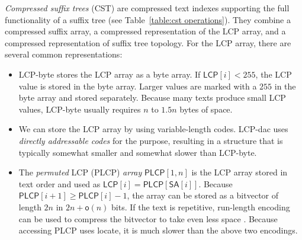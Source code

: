 \documentclass[a4paper,11pt]{llncs}
\newcommand{\CST}{\textsf{CST}}
\newcommand{\mSA}{\ensuremath{\mathsf{SA}}}
\newcommand{\LCP}{\textsf{LCP}}
\newcommand{\PLCP}{\textsf{PLCP}}
\newcommand{\LCPbyte}{\textsf{LCP\nobreakdash-byte}}
\newcommand{\LCPdac}{\textsf{LCP\nobreakdash-dac}}
\newcommand{\mLCP}{\ensuremath{\mathsf{LCP}}}
\newcommand{\mPLCP}{\ensuremath{\mathsf{PLCP}}}
\newcommand{\locate}{\textsf{locate}}
\newcommand{\oh}{\ensuremath{\mathsf{o}}}
\begin{document}
\emph{Compressed suffix trees} (\CST) \cite{Sadakane2007} are compressed text
indexes supporting the full functionality of a suffix tree (see
Table~\ref{table:cst operations}). They combine a compressed suffix array, a
compressed representation of the \LCP{} array, and a compressed representation
of suffix tree topology. For the \LCP{} array, there are several common
representations:
\begin{itemize}
\item \LCPbyte{} \cite{Abouelhoda2004} stores the \LCP{} array as a byte
array. If $\mLCP[i] < 255$, the \LCP{} value is stored in the byte array.
Larger values are marked with a $255$ in the byte array and stored separately.
Because many texts produce small \LCP{} values, \LCPbyte{} usually requires
$n$ to $1.5n$ bytes of space.
\item We can store the \LCP{} array by using variable-length codes. \LCPdac{}
uses \emph{directly addressable codes} \cite{Brisaboa2009} for the purpose,
resulting in a structure that is typically somewhat smaller and somewhat
slower than \LCPbyte.
\item The \emph{permuted} \LCP{} (\PLCP) \emph{array} \cite{Sadakane2007}
$\mPLCP[1,n]$ is the \LCP{} array stored in text order and used as $\mLCP[i] =
\mPLCP[\mSA[i]]$. Because $\mPLCP[i+1] \ge \mPLCP[i]-1$, the array can be
stored as a bitvector of length $2n$ in $2n+\oh(n)$ bits. If the text is
repetitive, run-length encoding can be used to compress the bitvector to take
even less space \cite{Fischer2009a}. Because accessing \PLCP{} uses \locate,
it is much slower than the above two encodings.
\end{itemize}
\end{document}
